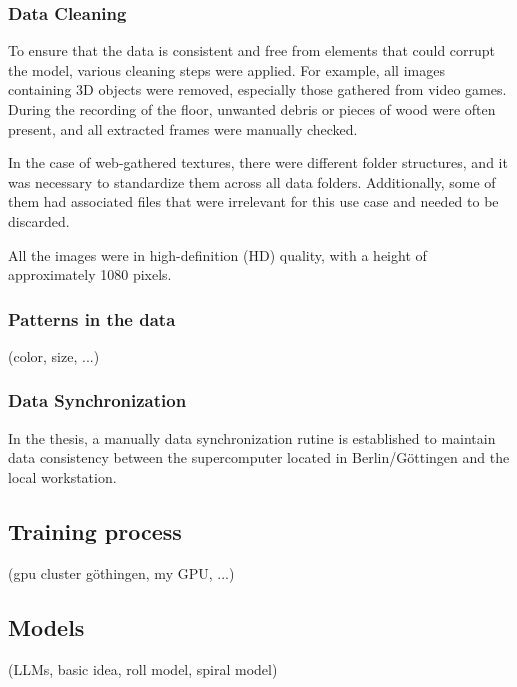 \subsubsection{Data Cleaning}

    To ensure that the data is consistent and free from elements that could corrupt the model, various cleaning steps were applied. For example, all images containing 3D objects were removed, especially those gathered from video games. During the recording of the floor, unwanted debris or pieces of wood were often present, and all extracted frames were manually checked.

    In the case of web-gathered textures, there were different folder structures, and it was necessary to standardize them across all data folders. Additionally, some of them had associated files that were irrelevant for this use case and needed to be discarded.

    All the images were in high-definition (HD) quality, with a height of approximately 1080 pixels.

    \subsubsection{Patterns in the data}
        (color, size, ...)

    \subsubsection{Data Synchronization}

    In the thesis, a manually data synchronization rutine is established to maintain data consistency between the supercomputer located in Berlin/Göttingen and the local workstation.


\subsection{Training process}
    (gpu cluster göthingen, my GPU, ...)

\subsection{Models}
    (LLMs, basic idea, roll model, spiral model)